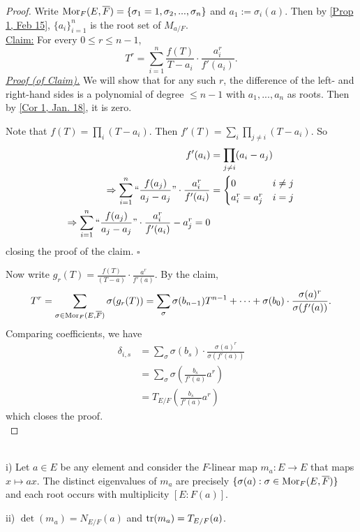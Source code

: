 \begin{proof}
	Write $\operatorname{Mor}_F(E, \overline{F}) = \{\sigma_1 = 1, \sigma_2, ..., \sigma_n\}$ and $a_1 := \sigma_i(a)$. Then by \ref{Prop 1, Feb 15}, $\{a_i\}_{i=1}^n$ is the root set of $M_{a/F}$. \\
	\noindent \underline{Claim:} For every $0 \leq r \leq n-1$,
		\[T^r = \sum_{i=1}^n \frac{f(T)}{T - a_i} \cdot \frac{a_i^r}{f'(a_i)}.\]
	\noindent \underline{\textit{Proof (of Claim).}} We will show that for any such $r$, the difference of the left- and right-hand sides is a polynomial of degree $\leq n-1$ with $a_1, ..., a_n$ as roots. Then by \ref{Cor 1, Jan. 18}, it is zero. 
	
	Note that $f(T) = \prod_i (T - a_i)$. Then $f'(T) = \sum_i \prod_{j \neq i} (T - a_i)$. So 
		\begin{align*}
			f'(a_i) &= \prod_{j \neq i} (a_i - a_j) \\
			\Rightarrow \sum_{i = 1}^n ``\frac{f(a_j)}{a_j - a_j}" \cdot \frac{a_i^r}{f'(a_i)} &= \begin{cases} 0 & i \neq j \\ a_i^r = a_j^r & i = j \end{cases} \\
			\Rightarrow \sum_{i = 1}^n ``\frac{f(a_j)}{a_j - a_j}" \cdot \frac{a_i^r}{f'(a_i)} - a_j^r = 0
		\end{align*}
	closing the proof of the claim. $\square$
	
	Now write $g_r(T) = \frac{f(T)}{(T - a)} \cdot \frac{a^r}{f'(a)}$. By the claim, 
		\[T^r = \sum_{\sigma \in \operatorname{Mor}_F(E, \overline{F})} \sigma(g_r(T)) = \sum_{\sigma} \sigma(b_{n-1})T^{n-1} + \cdots + \sigma(b_0) \cdot \frac{\sigma(a)^r}{\sigma(f'(a))}.\]
	Comparing coefficients, we have
		\begin{align*}
			\delta_{i,s} &= \sum_{\sigma} \sigma(b_s) \cdot \frac{\sigma(a)^r}{\sigma(f'(a))} \\
			&= \sum_{\sigma} \sigma \left( \frac{b_s}{f'(a)} a^r \right) \\
			&= T_{E/F} \left( \frac{b_s}{f'(a)} a^r \right)
		\end{align*}
	which closes the proof.\\
\end{proof}

\begin{prop}
	~\\
	i) Let $a \in E$ be any element and consider the $F$-linear map $m_a: E \rightarrow E$ that maps $x \mapsto ax$. The distinct eigenvalues of $m_a$ are precisely $\{\sigma(a) : \sigma \in \operatorname{Mor}_F(E, \overline{F})\}$ and each root occurs with multiplicity $[E : F(a)]$.
	
	\noindent ii) $\det(m_a) = N_{E/F}(a)$ and $\operatorname{tr}(m_a) = T_{E/F}(a)$.
\end{prop}

